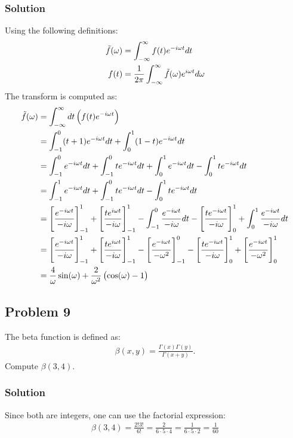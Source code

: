 \subsubsection*{Solution}
Using the following definitions:
\begin{align*}
    \tilde{f}(\omega) &=\int_{-\infty}^\infty f(t)e^{-i\omega t}dt\\
    f(t) &= \frac{1}{2\pi}\int_{-\infty}^\infty \tilde{f}(\omega)e^{i\omega t}d\omega
\end{align*}The transform is computed as:
\begin{align*}
    \tilde{f}(\omega) &= \int_{-\infty}^\infty dt\left(f(t)e^{-i\omega t}\right)\\
    &= \int_{-1}^0 (t+1)e^{-i\omega t}dt + \int_{0}^1(1-t)e^{-i\omega t}dt\\
    &= \int_{-1}^0 e^{-i\omega t}dt + \int_{-1}^0 te^{-i\omega t}dt + \int_{0}^1e^{-i\omega t}dt - \int_{0}^1te^{-i\omega t}dt\\
    &= \int_{-1}^1 e^{-i\omega t}dt + \int_{-1}^0 te^{-i\omega t}dt - \int_{0}^1te^{-i\omega t}dt\\
    &= \Bigg[\frac{e^{-i\omega t}}{-i\omega}\Bigg]_{-1}^1 +\Bigg[\frac{te^{i\omega t}}{-i\omega}\Bigg]_{ -1}^1 - \int_{-1}^0 \frac{e^{-i\omega t}}{-i\omega}dt - \Bigg[\frac{te^{-i\omega t}}{-i\omega}\Bigg]_{0}^1 + \int_{0}^1\frac{e^{-i\omega t}}{-i\omega}dt\\
    &= \Bigg[\frac{e^{-i\omega t}}{-i\omega}\Bigg]_{-1}^1 +\Bigg[\frac{te^{i\omega t}}{-i\omega}\Bigg]_{ -1}^1 - \Bigg[\frac{e^{-i\omega t}}{-\omega^2}\Bigg]_{-1}^0 - \Bigg[\frac{te^{-i\omega t}}{-i\omega}\Bigg]_{0}^1 + \Bigg[\frac{e^{-i\omega t}}{-\omega^2}\Bigg]_{0}^1\\
    &= \frac{4}{\omega}\sin(\omega) + \frac{2}{\omega^2}\left(\cos(\omega) - 1\right)
\end{align*}

\subsection*{Problem 9}
The beta function is defined as:
\begin{align*}
    \beta(x,y) = \frac{\Gamma(x)\Gamma(y)}{\Gamma(x +y)}.
\end{align*}Compute $\beta(3,4)$.

\subsubsection*{Solution}
Since both are integers, one can use the factorial expression:
\begin{align*}
    \beta(3,4) = \frac{2!3!}{6!} = \frac{2}{6\cdot 5\cdot 4} = \frac{1}{6\cdot 5 \cdot 2} = \frac{1}{60}
\end{align*}

